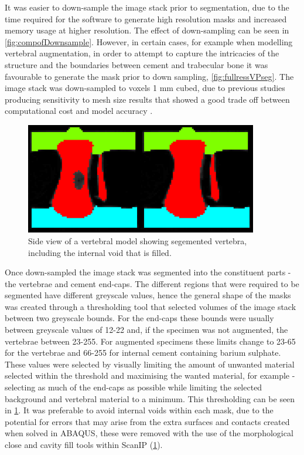 It was easier to down-sample the image stack prior to segmentation, due to the
time required for the software to generate high resolution masks and increased
memory usage at higher resolution. The effect of down-sampling can be seen in
\cref{fig:compofDownsample}. However, in certain cases, for example when
modelling vertebral augmentation, in order to attempt to capture the
intricacies of the structure and the boundaries between cement and trabecular
bone it was favourable to generate the mask prior to down sampling,
\cref{fig:fullressVPseg}. The image stack was down-sampled to voxels 1 mm
cubed, due to previous studies producing sensitivity to mesh size results that
showed a good trade off between computational cost and model accuracy
\cite{Jones2007}.



\begin{figure}[ht!]
\centering
  \includegraphics[width=4in]{images/fillTheVoid.png}
  \caption{Side view of a vertebral model showing segemented vertebra, including the internal void that is filled.}
\label{fig:fillTheVoid}
\end{figure}


Once down-sampled the image stack was segmented into the constituent parts -
the vertebrae and cement end-caps. The different regions that were required to
be segmented have different greyscale values, hence the general shape of the
masks was created through a thresholding tool that selected volumes of the
image stack between two greyscale bounds. For the end-caps these bounds were usually
between greyscale values of 12-22 and, if the specimen was not augmented, the
vertebrae between 23-255. For augmented specimens these limits change to 23-65
for the vertebrae and 66-255 for internal cement containing barium sulphate.
These values were selected by visually limiting the amount of unwanted material
selected within the threshold and maximising the wanted material, for example -
selecting as much of the end-caps as possible while limiting the selected
background and vertebral material to a minimum. This thresholding can be seen
in \cref{fig:fillTheVoid}.  It was preferable to avoid internal voids within
each mask, due to the potential for errors that may arise from the extra
surfaces and contacts created when solved in ABAQUS, these were removed with the use of the morphological
close and cavity fill tools within ScanIP (\cref{fig:fillTheVoid}).





